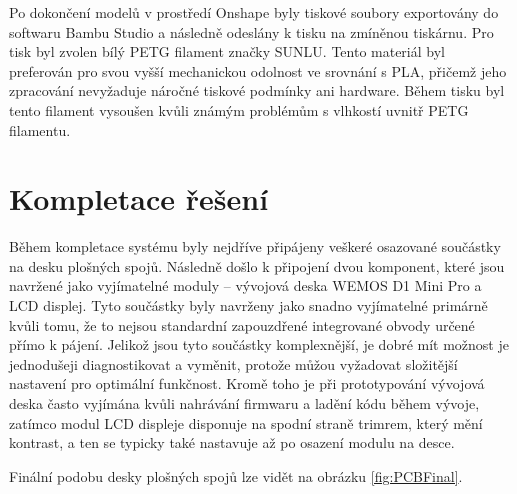 Po dokončení modelů v prostředí Onshape byly tiskové soubory exportovány do softwaru Bambu Studio a následně odeslány k tisku na zmíněnou tiskárnu. Pro tisk byl zvolen bílý PETG filament značky SUNLU. Tento materiál byl preferován pro svou vyšší mechanickou odolnost ve srovnání s PLA, přičemž jeho zpracování nevyžaduje náročné tiskové podmínky ani hardware. Během tisku byl tento filament vysoušen kvůli známým problémům s vlhkostí uvnitř PETG filamentu.

\section{Kompletace řešení}

Během kompletace systému byly nejdříve připájeny veškeré osazované součástky na desku plošných spojů. Následně došlo k připojení dvou komponent, které jsou navržené jako vyjímatelné moduly – vývojová deska WEMOS D1 Mini Pro a LCD displej. Tyto součástky byly navrženy jako snadno vyjímatelné primárně kvůli tomu, že to nejsou standardní zapouzdřené integrované obvody určené přímo k pájení. Jelikož jsou tyto součástky komplexnější, je dobré mít možnost je jednodušeji diagnostikovat a vyměnit, protože můžou vyžadovat složitější nastavení pro optimální funkčnost. Kromě toho je při prototypování vývojová deska často vyjímána kvůli nahrávání firmwaru a ladění kódu během vývoje, zatímco modul LCD displeje disponuje na spodní straně trimrem, který mění kontrast, a ten se typicky také nastavuje až po osazení modulu na desce.

Finální podobu desky plošných spojů lze vidět na obrázku \ref{fig:PCBFinal}.


